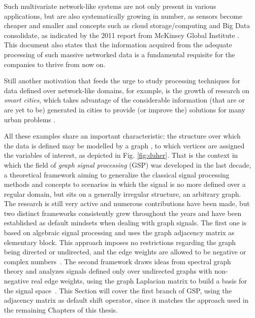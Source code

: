 Such multivariate network-like systems are not only present in various applications, but are also systematically growing in number, as sensors become cheaper and smaller and concepts such as cloud storage/computing and Big Data consolidate, as indicated by the 2011 report from McKinsey Global Institute \cite{mckinsey2011big}. This document also states that the information acquired from the adequate processing of such massive networked data is a fundamental requisite for the companies to thrive from now on.

Still another motivation that feeds the urge to study processing techniques for data defined over network-like domains, for example, is the growth of research on \emph{smart cities}, which takes advantage of the considerable information (that are or are yet to be) generated in cities to provide (or improve the) solutions  for many urban problems \cite{jain2014big}.

All these examples share an important characteristic: the structure over which the data is defined may be modelled by a graph \cite{mei2016signal}, to which vertices are assigned the variables of interest, as depicted in Fig. \ref{fig:duher}. That is the context in which the field of \emph{graph signal processing} (GSP) was developed in the last decade, a theoretical framework aiming to generalize the classical signal processing methods and concepts to scenarios in which the signal is no more defined over a regular domain, but sits on a generally irregular structure, an arbitrary graph. The research is still very active and numerous contributions have been made, but two distinct frameworks consistently grew throughout the years and have been established as default mindsets when dealing with graph signals. The first one is based on algebraic signal processing and uses the graph adjacency matrix as elementary block. This approach imposes no restrictions regarding the graph being directed or undirected, and the edge weights are allowed to be negative or complex numbers~\cite{sandryhaila2014big}. The second framework draws ideas from spectral graph theory and analyzes signals defined only over undirected graphs with non-negative real edge weights, using the graph Laplacian matrix to build a basis for the signal space~\cite{shuman2013emerging}. This Section will cover the first branch of GSP, using the adjacency matrix as default shift operator, since it matches the approach used in the remaining Chapters of this thesis.


